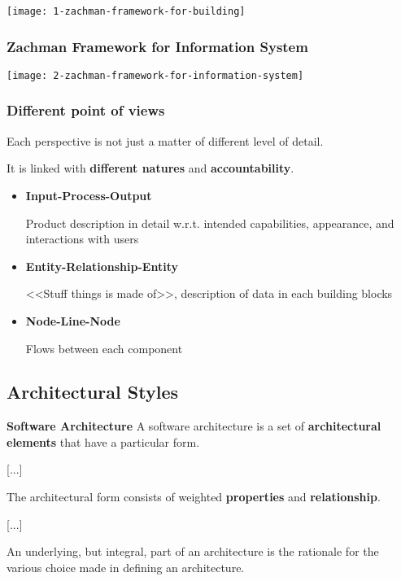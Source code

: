 \begin{center}
\texttt{[image: 1-zachman-framework-for-building]}
\end{center}

\subsubsection{Zachman Framework for Information System}
\begin{center}
\texttt{[image: 2-zachman-framework-for-information-system]}
\end{center}

\subsubsection{Different point of views}
Each perspective is not just a matter of different level of detail.

It is linked with \textbf{different natures} and \textbf{accountability}.

\begin{itemize}
	\item \textbf{Input-Process-Output}
	
	Product description in detail w.r.t. intended capabilities, appearance, and interactions with users
	
	\item \textbf{Entity-Relationship-Entity}
	
	<<Stuff things is made of>>, description of data in each building blocks
	
	\item \textbf{Node-Line-Node}
	
	Flows between each component
\end{itemize}

\subsection{Architectural Styles}

\textbf{Software Architecture}
A software architecture is a set of \textbf{architectural elements} that have a particular form.
\begin{center}
[...]
\end{center}
The architectural form consists of weighted \textbf{properties} and \textbf{relationship}.
\begin{center}
[...]
\end{center}
An underlying, but integral, part of an architecture is the rationale for the various choice made in defining an architecture.

